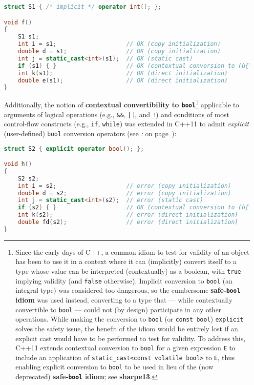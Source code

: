 \begin{lstlisting}[language=C++]
struct S1 { /* implicit */ operator int(); };

void f()
{
    S1 s1;
    int i = s1;                    // OK (copy initialization)
    double d = s1;                 // OK (copy initialization)
    int j = static_cast<int>(s1);  // OK (static cast)
    if (s1) { }                    // OK (contextual conversion to (ù{\codeincomments{bool}}ù))
    int k(s1);                     // OK (direct initialization)
    double e(s1);                  // OK (direct initialization)
}
\end{lstlisting}

\noindent Additionally, the notion of \textbf{contextual convertibility to
\texttt{bool}}{\cprotect\footnote{Since the early days of C++, a common
  idiom to test for validity of an object has been to use it in a
  context where it can (implicitly) convert itself to a type whose value
  can be interpreted (contextually) as a boolean, with \texttt{true}
  implying validity (and \texttt{false} otherwise). Implicit conversion
  to \texttt{bool} (an integral type) was considered too dangerous,
  so the cumbersome \textbf{safe-\texttt{bool} idiom} was used instead,
  converting to a type that --- while contextually convertible to
  \texttt{bool} --- could not (by design) participate in any other
  operations. While making the conversion to \texttt{bool} (or
  \texttt{const}~\texttt{bool}) \texttt{explicit} solves the safety
  issue, the benefit of the idiom would be entirely lost if an explicit
  cast would have to be performed to test for validity. To address this,
  C++11 extends contextual conversion to \texttt{bool} for a given
  expression \texttt{E} to include an application of
  \texttt{static\_cast<const}~\texttt{volatile}~\texttt{bool>} to
  \texttt{E}, thus enabling explicit conversion to \texttt{bool} to be
  used in lieu of the (now deprecated) \textbf{safe-\texttt{bool} idiom}; see
  \textbf{{sharpe13}}.}} applicable to arguments of logical operations
(e.g., \texttt{\&\&}, \texttt{||}, and \texttt{!}) and conditions of
most control-flow constructs (e.g., \texttt{if}, \texttt{while}) was
extended in C++11 to admit \emph{explicit} (user-defined) \texttt{bool}
conversion operators (see {\it{}: } on page~\pageref{enabling-contextual-conversions-to-bool-as-a-test-for-validity}):

\begin{lstlisting}[language=C++]
struct S2 { explicit operator bool(); };

void h()
{
    S2 s2;
    int i = s2;                    // error (copy initialization)
    double d = s2;                 // error (copy initialization)
    int j = static_cast<int>(s2);  // error (static cast)
    if (s2) { }                    // OK (contextual conversion to (ù{\codeincomments{bool}}ù))
    int k(s2);                     // error (direct initialization)
    double fd(s2);                 // error (direct initialization)
}
\end{lstlisting}

